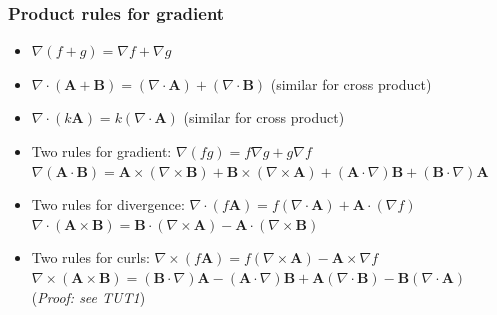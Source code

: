 \documentclass[12pt,a4paper,twoside]{article}
\numberwithin{equation}{section}
\begin{document}
	\subsubsection{Product rules for gradient}
	\begin{itemize}
		\item \(\nabla (f+g)=\nabla f+\nabla g\)
		\item \(\nabla\cdot(\textbf{A}+\textbf{B})=(\nabla\cdot \textbf{A})+(\nabla \cdot \textbf{B})\) (similar for cross product)
		\item \(\nabla\cdot  (k\textbf{A})=k(\nabla\cdot \textbf{A})\) (similar for cross product)
		\item Two rules for gradient:
		\subitem \(\nabla(fg)=f\nabla g+g\nabla f\)
		\subitem \(\nabla(\textbf{A}\cdot \textbf{B})=\textbf{A}\times (\nabla \times \textbf{B})+\textbf{B}\times (\nabla \times \textbf{A})+(\textbf{A}\cdot \nabla)\textbf{B}+(\textbf{B}\cdot \nabla)\textbf{A}\)
		\item Two rules for divergence:
		\subitem \(\nabla \cdot (f\textbf{A})=f(\nabla \cdot \textbf{A})+\textbf{A}\cdot (\nabla f)\)
		\subitem \(\nabla \cdot (\textbf{A}\times \textbf{B})=\textbf{B}\cdot(\nabla \times \textbf{A})-\textbf{A}\cdot (\nabla\times \textbf{B})\)
		\item Two rules for curls:
		\subitem \(\nabla \times (f\textbf{A})=f(\nabla \times \textbf{A})-\textbf{A}\times \nabla f\)
		\subitem \(\nabla \times(\textbf{A}\times \textbf{B})=(\textbf{B}\cdot \nabla)\textbf{A}-(\textbf{A}\cdot \nabla)\textbf{B}+\textbf{A}(\nabla \cdot \textbf{B})-\textbf{B}(\nabla\cdot \textbf{A})\) (\textit{Proof: see TUT1})
	\end{itemize}
	
\end{document}
